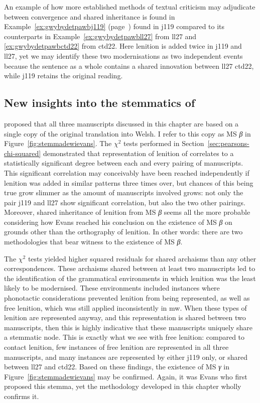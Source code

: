 An example of how more established methods of textual criticism may adjudicate between convergence and shared inheritance is  found in Example~\ref{ex:gwybydetpawbj119} (page~\pageref{ex:gwybydetpawbj119}) found in \gls{j119} compared to its counterparts in Example~\ref{ex:gwybydetpawbll27} from \gls{ll27} and \ref{ex:gwybydetpawbctd22} from \gls{ctd22}. Here lenition is added twice in \gls{j119} and \gls{ll27}, yet we may identify these two modernisations as two independent events  because the sentence as a whole contains a shared innovation between \gls{ll27} \gls{ctd22}, while \gls{j119} retains the original reading. 

\subsection{New insights into the stemmatics of }
\label{sec:new-insights-into}

\Textcite[lviii]{Eva_Welsh88} proposed that all three manuscripts discussed in this chapter are based on a single copy of the original translation into Welsh. I refer to this copy as MS \textit{β} in Figure~\ref{fig:stemmadewievans}. The \(\chi^2\) tests performed in Section~\ref{sec:pearsons-chi-squared} demonstrated that representation of lenition of  correlates to a statistically significant degree between each and every pairing of manuscripts. This significant correlation may conceivably have been reached independently if lenition was added in similar patterns three times over, but chances of this being true grow slimmer as the amount of manuscripts involved grows: not only the pair \gls{j119} and \gls{ll27} show significant correlation, but also the two other pairings. Moreover, shared inheritance of lenition from MS \textit{β} seems all the more probable considering how Evans reached his conclusion on the existence of MS \textit{β} on grounds other than the orthography of lenition. In other words: there are two methodologies that bear witness to the existence of MS \textit{β}. 

The \(\chi^2\) tests yielded higher squared residuals for shared archaisms than any other correspondences. These archaisms shared between at least two manuscripts led to the identification of the grammatical environments in which lenition was the least likely to be modernised. These environments included instances where phonotactic considerations prevented lenition from being represented, as well as free lenition, which was still applied inconsistently in \gls{mw}. When these types of lenition are represented anyway, and this representation is shared between two manuscripts, then this is highly indicative that these manuscripts uniquely share a stemmatic node. This is exactly what we see with free lenition: compared to contact lenition, few instances of free lenition are represented in all three manuscripts, and many instances are represented by either \gls{j119} only, or shared between \gls{ll27} and \gls{ctd22}. Based on these findings, the existence of MS \textit{γ} in Figure~\ref{fig:stemmadewievans} may be confirmed. Again, it was Evans who first proposed this stemma, yet the methodology developed in this chapter wholly confirms it.

